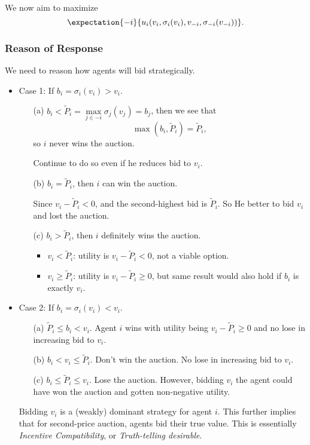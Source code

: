 We now aim to maximize
\[
	\expectation{-i}{u_{i}(v_{i}, \sigma_{i}(v_{i}), v_{-i}, \sigma_{-i}(v_{-i}))}.
\]

\subsubsection{Reason of Response}
We need to reason how agents will bid strategically.
\begin{itemize}
	\item Case 1: If \(b_{i} = \sigma_{i}(v_{i})>v_{i}\).
	      \begin{enumerate}
		      \item[(a)] \(b_{i}< \widetilde{P}_i = \max\limits_{j\in -i}\sigma_{j}(v_{j}) = b_{j}\), then we see that
			      \[
				      \max(b_{i}, \widetilde{P}_{i}) = \widetilde{P}_{i},
			      \]
			      so \(i\) never wins the auction.
			      \par Continue to do so even if he reduces bid to \(v_{i}\).
		      \item[(b)] \(b_{i} = \widetilde{P}_{i}\), then \(i\) can win the auction.
			      \par Since \(v_{i} - \widetilde{P}_{i}<0\),  and the second-highest bid is \(\widetilde{P}_{i}\). So He better to bid \(v_{i}\) and
			      lost the auction.
		      \item[(c)] \(b_{i} > \widetilde{P}_{i}\), then \(i\) definitely wins the auction.
			      \begin{itemize}
				      \item \(v_{i}<\widetilde{P}_{i}\): utility is \(v_{i} - \widetilde{P}_{i}<0\), not a viable option.
				      \item \(v_{i}\geq \widetilde{P}_{i}\): utility is \(v_{i} - \widetilde{P}_{i}\geq 0\), but
				            same result would also hold if \(b_{i}\) is exactly \(v_{i}\).
			      \end{itemize}
	      \end{enumerate}
	\item Case 2: If \(b_{i} = \sigma_{i}(v_{i})<v_{i}\).
	      \begin{enumerate}
		      \item[(a)] \(\widetilde{P}_{i}\leq b_{i}<v_{i}\). Agent \(i\) wins with utility being \(v_{i} - \widetilde{P}_{i}\geq 0\) and
			      no lose in increasing bid to \(v_{i}\).
		      \item[(b)] \(b_{i}< v_{i}\leq \widetilde{P}_{i}\). Don't win the auction. No lose in increasing bid to \(v_{i}\).
		      \item[(c)] \(b_{i}\leq \widetilde{P}_{i}\leq v_{i}\). Lose the auction. However, bidding \(v_{i}\) the agent could have won the
			      auction and gotten non-negative utility.
	      \end{enumerate}
	      \begin{remark}
		      Bidding \(v_i\) is a (weakly) dominant strategy for agent \(i\). This further implies that for second-price auction, agents
		      bid their true value. This is essentially \emph{Incentive Compatibility}, or \emph{Truth-telling desirable}.
	      \end{remark}
\end{itemize}


